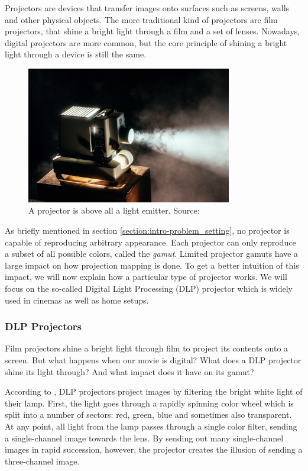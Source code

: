 Projectors are devices that transfer images onto surfaces such as screens, walls and other physical objects. The more traditional kind of projectors are film projectors, that shine a bright light through a film and a set of lenses. Nowadays, digital projectors are more common, but the core principle of shining a bright light through a device is still the same.

\begin{figure}[ht]
    \centering
    \includegraphics[width=0.8\textwidth]{images/02-projector.jpg}
    \caption{A projector is above all a light emitter. Source: \citet{ImageProjector}}
    \label{fig:background_projector}
\end{figure}

As briefly mentioned in section \ref{section:intro-problem_setting}, no projector is capable of reproducing arbitrary appearance. Each projector can only reproduce a subset of all possible colors, called the \textit{gamut}. Limited projector gamuts have a large impact on how projection mapping is done. To get a better intuition of this impact, we will now explain how a particular type of projector works. We will focus on the so-called Digital Light Processing (DLP) projector which is widely used in cinemas as well as home setups.

\subsubsection{DLP Projectors}
\label{section:background-projection_mapping-projectors-DLP}

Film projectors shine a bright light through film to project its contents onto a screen. But what happens when our movie is digital? What does a DLP projector shine its light through? And what impact does it have on its gamut?

According to \citet{WikiDLP}, DLP projectors project images by filtering the bright white light of their lamp. First, the light goes through a rapidly spinning color wheel which is split into a number of sectors: red, green, blue and sometimes also transparent. At any point, all light from the lamp passes through a single color filter, sending a single-channel image towards the lens. By sending out many single-channel images in rapid succession, however, the projector creates the illusion of sending a three-channel image.

